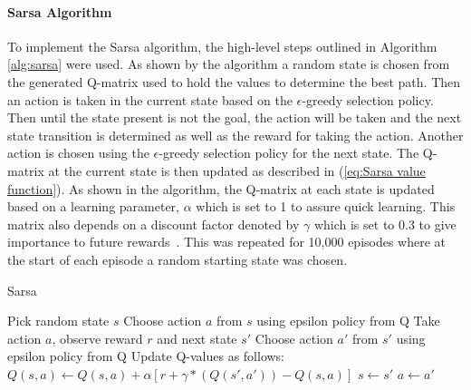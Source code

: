 \documentclass[12pt,american]{report}
\providecommand{\DIFaddtex}[1]{{\protect\color{blue}\uwave{#1}}} %
\providecommand{\DIFdeltex}[1]{{\protect\color{red}\sout{#1}}}                      %
\providecommand{\DIFaddbegin}{} %
\providecommand{\DIFaddend}{} %
\providecommand{\DIFdelbegin}{} %
\providecommand{\DIFdelend}{} %
\providecommand{\DIFadd}[1]{\texorpdfstring{\DIFaddtex{#1}}{#1}} %
\providecommand{\DIFdel}[1]{\texorpdfstring{\DIFdeltex{#1}}{}} %
\newcommand{\DIFscaledelfig}{0.5}
\newlength{\DIFdelgraphicswidth} %
\newlength{\DIFdelgraphicsheight} %
\newcommand{\DIFaddincludegraphics}[2][]{{\color{blue}\fbox{\DIFOincludegraphics[#1]{#2}}}} %
\newcommand{\DIFdelincludegraphics}[2][]{%
\sbox{\DIFdelgraphicsbox}{\DIFOincludegraphics[#1]{#2}}%
\settoboxwidth{\DIFdelgraphicswidth}{\DIFdelgraphicsbox} %
\settoboxtotalheight{\DIFdelgraphicsheight}{\DIFdelgraphicsbox} %
\scalebox{\DIFscaledelfig}{%
\parbox[b]{\DIFdelgraphicswidth}{\usebox{\DIFdelgraphicsbox}\\[-\baselineskip] \rule{\DIFdelgraphicswidth}{0em}}\llap{\resizebox{\DIFdelgraphicswidth}{\DIFdelgraphicsheight}{%
\setlength{\unitlength}{\DIFdelgraphicswidth}%
\begin{picture}(1,1)%
\thicklines\linethickness{2pt} %
{\color[rgb]{1,0,0}\put(0,0){\framebox(1,1){}}}%
{\color[rgb]{1,0,0}\put(0,0){\line( 1,1){1}}}%
{\color[rgb]{1,0,0}\put(0,1){\line(1,-1){1}}}%
\end{picture}%
}\hspace*{3pt}}} %
} %
\DeclareRobustCommand{\DIFaddbegin}{\DIFOaddbegin \let\includegraphics\DIFaddincludegraphics} %
\DeclareRobustCommand{\DIFaddend}{\DIFOaddend \let\includegraphics\DIFOincludegraphics} %
\DeclareRobustCommand{\DIFdelbegin}{\DIFOdelbegin \let\includegraphics\DIFdelincludegraphics} %
\DeclareRobustCommand{\DIFdelend}{\DIFOaddend \let\includegraphics\DIFOincludegraphics} %
\begin{document}
\paragraph{Sarsa Algorithm}
To implement the Sarsa algorithm, the high-level steps outlined in Algorithm \ref{alg:sarsa} were used.  As shown by the algorithm a random state is chosen from the generated Q-matrix used to hold the values to determine the best path.  Then an action is taken in the current state based on the \begin{math}\epsilon\end{math}-greedy selection policy.  Then until the state present is not the goal, the action will be taken and the next state transition is determined as well as the reward for taking the action. Another action is chosen using the \begin{math}\epsilon\end{math}-greedy selection policy for the next state. The Q-matrix at the current state is then updated as described in (\ref{eq:Sarsa value function}). As shown in the algorithm, the Q-matrix at each state is updated based on a learning parameter, \begin{math}\alpha\end{math} which is set to 1 to assure quick learning. This matrix also depends on a discount factor denoted by \begin{math}\gamma\end{math} which is set to 0.3 to give importance to future rewards~\cite{Eden}. This was repeated for 10,000 episodes where at the start of each episode a random starting state was chosen.



\begin{algorithm}
\caption{Sarsa~\cite{Eden}}
\label{alg:sarsa}
\begin{algorithmic} 
\State Pick random state $s$
\State Choose action $a$ from $s$ using epsilon policy from Q
\State Take action $a$, observe reward $r$ and next state $s'$
\State Choose action $a'$ from $s'$ using epsilon policy from Q
\State Update Q-values as follows:
\State \DIFdelbegin \DIFdel{$Q(s,a) \leftarrow Q(s,a) + \alpha [r+ \gamma*(Q(s',a')) - Q(s,a)] $
}\DIFdelend \DIFaddbegin \DIFadd{$Q(s,a) \leftarrow Q(s,a) + \alpha [r(s,a)+ \gamma*(Q(s',a')) - Q(s,a)] $
}\DIFaddend \State $s \leftarrow s'$
\State $a \leftarrow a'$
\EndWhile
\EndFor
\end{algorithmic}
\end{algorithm}
\end{document}
